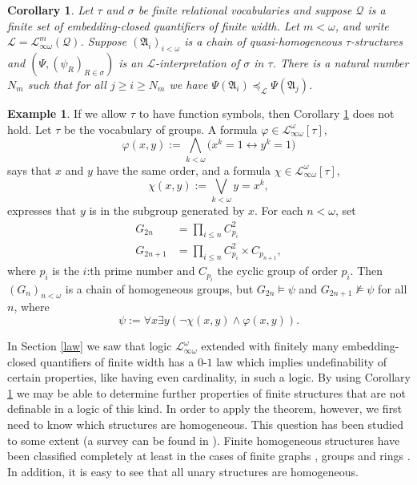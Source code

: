 \documentclass{ndjflart}
\theoremstyle{plain}
\newtheorem{corollary}[conjecture]{Corollary}
\theoremstyle{definition}
\newtheorem{example}[conjecture]{Example}
\numberwithin{equation}{section}
\begin{document}
\begin{corollary}\label{finite2}
Let $\tau$ and $\sigma$ be finite relational vocabularies and suppose
$\mathcal{Q}$ is a finite set of embedding-closed quantifiers of finite width.
Let $m < \omega$, and write
$\mathcal{L} = \mathcal{L}^m_{\infty\omega}(\mathcal{Q})$.
Suppose $(\mathfrak{A}_i)_{i<\omega}$ is a chain of quasi-homogeneous
$\tau$-structures and $(\Psi,(\psi_R)_{R\in\sigma})$ is an
$\mathcal{L}$-interpretation of $\sigma$ in $\tau$.
There is a natural number $N_m$ such that for all $j \geq i \geq N_m$ we have
$\Psi(\mathfrak{A}_i) \preceq_{\mathcal{L}} \Psi(\mathfrak{A}_j)$.
\end{corollary}

\begin{example}\label{groups}
If we allow $\tau$ to have function symbols, then Corollary \ref{finite2} does not hold.
Let $\tau$ be the vocabulary of groups.
A formula $\varphi \in \mathcal{L}_{\infty\omega}^{\omega}[\tau]$,
\[
	\varphi(x,y) := \bigwedge_{k<\omega}\big(x^k=1 \leftrightarrow y^k=1\big)
\]
says that $x$ and $y$ have the same order, and a formula
$\chi \in \mathcal{L}_{\infty\omega}^{\omega}[\tau]$,
\[
	\chi(x,y) := \bigvee_{k<\omega}y = x^k,
\]
expresses that $y$ is in the subgroup generated by $x$.
For each $n<\omega$, set
\begin{align*}
	G_{2n} &= \prod_{i\leq n} C_{p_i}^2 \\
	G_{2n+1} &= \prod_{i\leq n} C_{p_i}^2 \times C_{p_{n+1}},
\end{align*}
where $p_i$ is the $i$:th prime number and $C_{p_i}$ the cyclic group of order $p_i$.
Then $(G_n)_{n<\omega}$ is a chain of homogeneous groups, but
$G_{2n} \vDash \psi$ and $G_{2n+1} \nvDash \psi$ for all $n$, where
\[
	\psi := \forall x \exists y(\neg\chi(x,y) \wedge \varphi(x,y)).
\]
\end{example}

In Section \ref{law} we saw that logic $\mathcal{L}^{\omega}_{\infty\omega}$
extended with finitely many em\-bed\-ding-closed quantifiers of finite width has
a $0$-$1$ law which implies undefinability of certain properties, like having
even cardinality, in such a logic.
By using Corollary \ref{finite2} we may be able to determine further properties
of finite structures that are not definable in a logic of this kind.
In order to apply the theorem, however, we first need to know which structures
are homogeneous.
This question has been studied to some extent (a survey can be found in
\cite{Lachlan:1986}).
Finite homogeneous structures have been classified completely at least in the cases
of finite graphs \cite{Gardiner:1976}, groups \cite{Cherlin:2000} and rings
\cite{Saracino:1988}.
In addition, it is easy to see that all unary structures are homogeneous.
\end{document}
